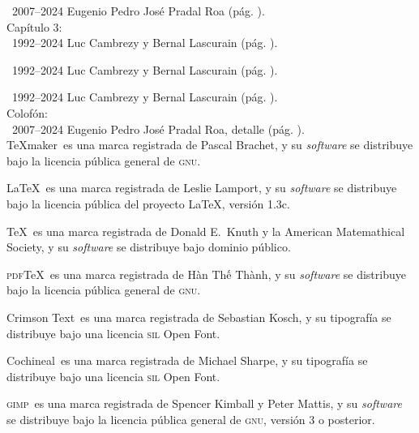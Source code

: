 \documentclass[14pt,twoside,final]{extbook} %
\begin{document}
\noindent\textcopyright\ 2007--2024 Eugenio Pedro José Pradal Roa (pág. \pageref{fig:jalacingo-photo}). \\

\noindent Capítulo 3: \\

\noindent\textcopyright\ 1992--2024 Luc Cambrezy y Bernal Lascurain (pág. \pageref{fig:hda-limon}).

\noindent\textcopyright\ 1992--2024 Luc Cambrezy y Bernal Lascurain (pág. \pageref{fig:hda-cuatotolapam}).

\noindent\textcopyright\ 1992--2024 Luc Cambrezy y Bernal Lascurain (pág. \pageref{fig:hda-tenextepec}). \\

\noindent Colofón: \\

\noindent\textcopyright\ 2007--2024 Eugenio Pedro José Pradal Roa, detalle (pág. \pageref{fig:vineta}). \\

\TeX{}maker\texttrademark\ es una marca registrada de Pascal Brachet, y su \emph{software} se distribuye bajo la licencia pública general de \textsc{gnu}.

\LaTeX\texttrademark\ es una marca registrada de Leslie Lamport, y su \emph{software} se distribuye bajo la licencia pública del proyecto \LaTeX{}, versión 1.3c.

\TeX\texttrademark\ es una marca registrada de Donald E.~Knuth y la American Matemathical Society, y su \emph{software} se distribuye bajo dominio público.

\textsc{pdf}\TeX\texttrademark\ es una marca registrada de H\`{a}n Th\'{\^{e}} Th\`{a}nh, y su \emph{software} se distribuye bajo la licencia pública general de \textsc{gnu}.

Crimson Text\texttrademark\ es una marca registrada de Sebastian Kosch, y su tipografía se distribuye bajo una licencia \textsc{sil} Open Font.

Cochineal\texttrademark\ es una marca registrada de Michael Sharpe, y su tipografía se distribuye bajo una licencia \textsc{sil} Open Font.

\textsc{gimp}\texttrademark\ es una marca registrada de Spencer Kimball y Peter Mattis, y su \emph{software} se distribuye bajo la licencia pública general de \textsc{gnu}, versión 3 o posterior.
\end{document}
